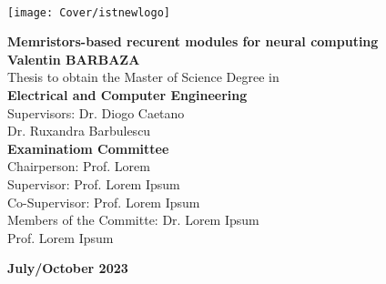 \newcommand\blurredimage[3]{
  \node[opacity=0.2] at (#1) {\texttt{[image: \#3]}};
  \node[opacity=0.2] at (#1+ #2, #2) {\texttt{[image: \#3]}};
  \node[opacity=0.2] at (#1+-#2, #2) {\texttt{[image: \#3]}};
  \node[opacity=0.2] at (#1+-#2,-#2) {\texttt{[image: \#3]}};
  \node[opacity=0.2] at (#1+ #2,-#2) {\texttt{[image: \#3]}};
  }
  \setcounter{page}{1} 


  \thispagestyle{empty}

  \begin{flushleft}
    ~\\ \vspace{-12mm} \hspace{-12mm}
    \texttt{[image: Cover/istnewlogo]}
    \vspace{10mm}
    \\ \begin{center}
    \end{center} %

    \vspace{5mm}
    \centering
    \LARGE \textbf{Memristors-based recurent modules for neural computing}
    \\ \vspace{15mm}
    \Large \textbf{Valentin BARBAZA} \\
    \vspace{12mm}
    \large Thesis to obtain the Master of Science Degree in
    \\ \vspace{2mm}
    \LARGE \textbf{Electrical and Computer Engineering}
    \\ \vspace{10mm}
    \large Supervisors: Dr. Diogo Caetano \\
    \large Dr. Ruxandra Barbulescu
    \\ \vspace{15mm}
    \Large \textbf{Examinatiom Committee}
    \\ \vspace{5mm}
    \large Chairperson: Prof. Lorem \\
    \large Supervisor: Prof. Lorem Ipsum\\
    \large Co-Supervisor: Prof. Lorem Ipsum \\
    \large Members of the Committe: Dr. Lorem Ipsum \\
    Prof. Lorem Ipsum

    \vspace{10mm}

    \Large \textbf{July/October 2023} \\
    \let\thepage\relax
  \end{flushleft}
